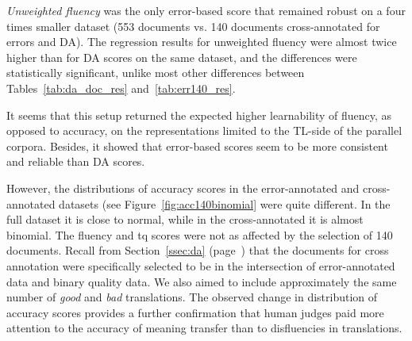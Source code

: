 \textit{Unweighted fluency} was the only error-based score that remained robust on a four times smaller dataset (553 documents vs. 140 documents cross-annotated for errors and DA). The regression results for unweighted fluency were almost twice higher than for DA scores on the same dataset, and the differences were statistically significant, unlike most other differences between Tables~\ref{tab:da_doc_res} and~\ref{tab:err140_res}.

It seems that this setup returned the expected higher learnability of fluency, as opposed to accuracy, on the representations limited to the TL-side of the parallel corpora. Besides, it showed that error-based scores seem to be more consistent and reliable than DA scores. %
 
However, the distributions of accuracy scores in the error-annotated and cross-annotated datasets (see Figure~\ref{fig:acc140binomial} were quite different. In the full dataset it is close to normal, while in the cross-annotated it is almost binomial. The fluency and tq scores were not as affected by the selection of 140 documents. Recall from Section~\ref{ssec:da} (page~\pageref{pg:intersection140}) that the documents for cross annotation were specifically selected to be in the intersection of error-annotated data and binary quality data. We also aimed to include approximately the same number of \textit{good} and \textit{bad} translations. The observed change in distribution of accuracy scores provides a further confirmation that human judges paid more attention to the accuracy of meaning transfer than to disfluencies in translations. 

